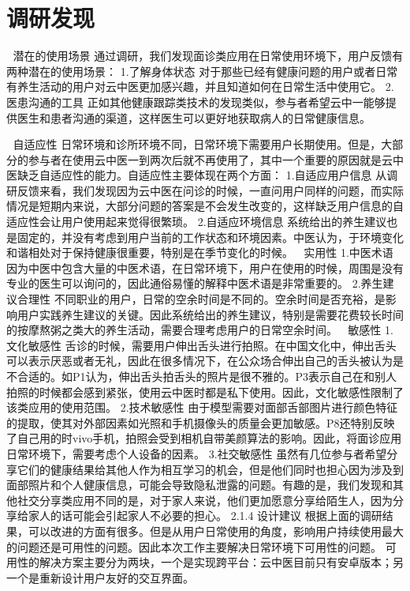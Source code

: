 \section{调研发现}
	潜在的使用场景
通过调研，我们发现面诊类应用在日常使用环境下，用户反馈有两种潜在的使用场景：
1.了解身体状态
对于那些已经有健康问题的用户或者日常有养生活动的用户对云中医更加感兴趣，并且知道如何在日常生活中使用它。
2.医患沟通的工具
正如其他健康跟踪类技术的发现类似，参与者希望云中一能够提供医生和患者沟通的渠道，这样医生可以更好地获取病人的日常健康信息。


	自适应性
日常环境和诊所环境不同，日常环境下需要用户长期使用。但是，大部分的参与者在使用云中医一到两次后就不再使用了，其中一个重要的原因就是云中医缺乏自适应性的能力。自适应性主要体现在两个方面：
1.自适应用户信息
从调研反馈来看，我们发现因为云中医在问诊的时候，一直问用户同样的问题，而实际情况是短期内来说，大部分问题的答案是不会发生改变的，这样缺乏用户信息的自适应性会让用户使用起来觉得很繁琐。
2.自适应环境信息
系统给出的养生建议也是固定的，并没有考虑到用户当前的工作状态和环境因素。中医认为，于环境变化和谐相处对于保持健康很重要，特别是在季节变化的时候。
	实用性
1.中医术语
 因为中医中包含大量的中医术语，在日常环境下，用户在使用的时候，周围是没有专业的医生可以询问的，因此通俗易懂的解释中医术语是非常重要的。
2.养生建议合理性
不同职业的用户，日常的空余时间是不同的。空余时间是否充裕，是影响用户实践养生建议的关键。因此系统给出的养生建议，特别是需要花费较长时间的按摩熬粥之类大的养生活动，需要合理考虑用户的日常空余时间。
	敏感性
1.文化敏感性
舌诊的时候，需要用户伸出舌头进行拍照。在中国文化中，伸出舌头可以表示厌恶或者无礼，因此在很多情况下，在公众场合伸出自己的舌头被认为是不合适的。如P1认为，伸出舌头拍舌头的照片是很不雅的。P3表示自己在和别人拍照的时候都会感到紧张，使用云中医时都是私下使用。因此，文化敏感性限制了该类应用的使用范围。
2.技术敏感性
由于模型需要对面部舌部图片进行颜色特征的提取，使其对外部因素如光照和手机摄像头的质量会更加敏感。P8还特别反映了自己用的时vivo手机，拍照会受到相机自带美颜算法的影响。因此，将面诊应用日常环境下，需要考虑个人设备的因素。
3.社交敏感性
虽然有几位参与者希望分享它们的健康结果给其他人作为相互学习的机会，但是他们同时也担心因为涉及到面部照片和个人健康信息，可能会导致隐私泄露的问题。有趣的是，我们发现和其他社交分享类应用不同的是，对于家人来说，他们更加愿意分享给陌生人，因为分享给家人的话可能会引起家人不必要的担心。
2.1.4 设计建议
	根据上面的调研结果，可以改进的方面有很多。但是从用户日常使用的角度，影响用户持续使用最大的问题还是可用性的问题。因此本次工作主要解决日常环境下可用性的问题。
	可用性的解决方案主要分为两块，一个是实现跨平台：云中医目前只有安卓版本；另一个是重新设计用户友好的交互界面。
